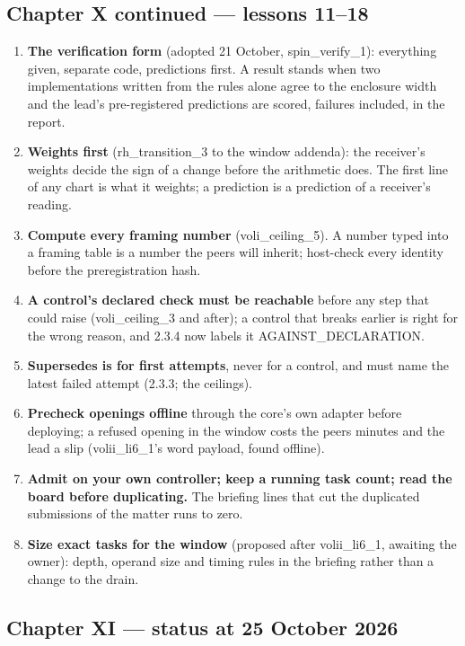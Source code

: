 \subsection{Chapter X continued --- lessons 11--18}\label{chapter-x-continued-lessons-1118}

\begin{enumerate}
\def\labelenumi{\arabic{enumi}.}
\setcounter{enumi}{10}
\tightlist
\item
  \textbf{The verification form} (adopted 21 October, spin\_verify\_1): everything given, separate code, predictions first. A result stands when two implementations
  written from the rules alone agree to the enclosure width and the lead's pre-registered predictions are scored, failures included, in the report.
\item
  \textbf{Weights first} (rh\_transition\_3 to the window addenda): the receiver's weights decide the sign of a change before the arithmetic does. The first line of any
  chart is what it weights; a prediction is a prediction of a receiver's reading.
\item
  \textbf{Compute every framing number} (voli\_ceiling\_5). A number typed into a framing table is a number the peers will inherit; host-check every identity before the
  preregistration hash.
\item
  \textbf{A control's declared check must be reachable} before any step that could raise (voli\_ceiling\_3 and after); a control that breaks earlier is right for the wrong
  reason, and 2.3.4 now labels it AGAINST\_DECLARATION.
\item
  \textbf{Supersedes is for first attempts}, never for a control, and must name the latest failed attempt (2.3.3; the ceilings).
\item
  \textbf{Precheck openings offline} through the core's own adapter before deploying; a refused opening in the window costs the peers minutes and the lead a slip
  (volii\_li6\_1's word payload, found offline).
\item
  \textbf{Admit on your own controller; keep a running task count; read the board before duplicating.} The briefing lines that cut the duplicated submissions of the
  matter runs to zero.
\item
  \textbf{Size exact tasks for the window} (proposed after volii\_li6\_1, awaiting the owner): depth, operand size and timing rules in the briefing rather than a change
  to the drain.
\end{enumerate}

\subsection{Chapter XI --- status at 25 October 2026}\label{chapter-xi-status-at-25-october-2026}


